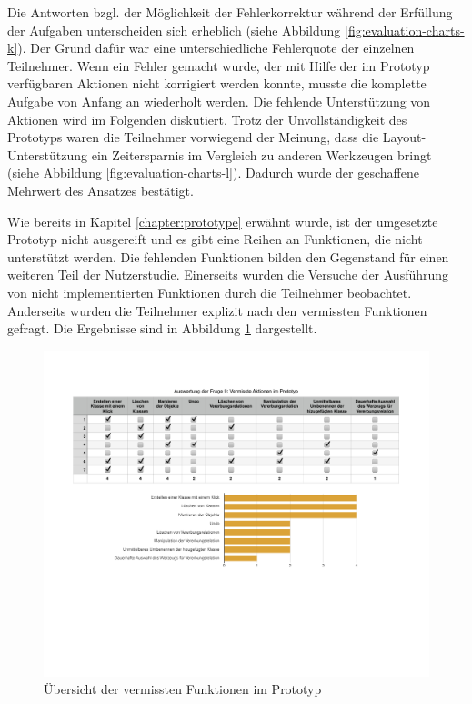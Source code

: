 Die Antworten bzgl. der Möglichkeit der Fehlerkorrektur während der Erfüllung der Aufgaben unterscheiden sich erheblich (siehe Abbildung \ref{fig:evaluation-charts-k}). Der Grund dafür war eine unterschiedliche Fehlerquote der einzelnen Teilnehmer. Wenn ein Fehler gemacht wurde, der mit Hilfe der im Prototyp verfügbaren Aktionen nicht korrigiert werden konnte, musste die komplette Aufgabe von Anfang an wiederholt werden. Die fehlende Unterstützung von Aktionen wird im Folgenden diskutiert. Trotz der Unvollständigkeit des Prototyps waren die Teilnehmer vorwiegend der Meinung, dass die Layout-Unterstützung ein Zeitersparnis im Vergleich zu anderen Werkzeugen bringt (siehe Abbildung \ref{fig:evaluation-charts-l}). Dadurch wurde der geschaffene Mehrwert des Ansatzes bestätigt.

Wie bereits in Kapitel \ref{chapter:prototype} erwähnt wurde, ist der umgesetzte Prototyp nicht ausgereift und es gibt eine Reihen an Funktionen, die nicht unterstützt werden. Die fehlenden Funktionen bilden den Gegenstand für einen weiteren Teil der Nutzerstudie. Einerseits wurden die Versuche der Ausführung von nicht implementierten Funktionen durch die Teilnehmer beobachtet. Anderseits wurden die Teilnehmer explizit nach den vermissten Funktionen gefragt. Die Ergebnisse sind in Abbildung \ref{fig:missed-prototype-functions} dargestellt.

\begin{figure}[hbt]
    \centering
    \includegraphics[width=\textwidth]{assets/missed-prototype-functions}
    \caption{Übersicht der vermissten Funktionen im Prototyp}
    \label{fig:missed-prototype-functions}
\end{figure}

